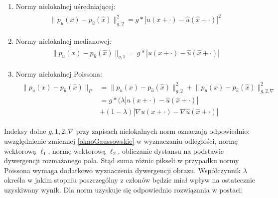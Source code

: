 \documentclass[12pt, twoside, openany]{report}
\theoremstyle{definition}
\begin{document}
\begin{enumerate}
\item
Normy nielokalnej uśredniającej:
\begin{align}
\begin{aligned}
\big\| p_{u}(x) - p_{\hat{u}}(\hat{x}) \big\|^{2}_{g,2} = g \ast | u(x+\cdot) - \hat{u}(\hat{x}+\cdot) |^2
\label{nonLocalMeans}
\end{aligned}
\end{align}
\item
Normy nielokalnej medianowej:
\begin{align}
\begin{aligned}
\big\| p_{u}(x) - p_{\hat{u}}(\hat{x}) \big\|_{g,1} = g \ast | u(x+\cdot) - \hat{u}(\hat{x}+\cdot) |
\label{nonLocalMedians}
\end{aligned}
\end{align}
\item
Normy nielokalnej Poissona:
\begin{align}
\begin{aligned}
\big\| p_{u}(x) - p_{\hat{u}}(\hat{x}) \big\|_{P} &= \big\| p_{u}(x) - p_{\hat{u}}(\hat{x}) \big\|^{2}_{g,2} + \big\| p_{u}(x) - p_{\hat{u}}(\hat{x}) \big\|^{2}_{g,2,\nabla} \\
&= g \ast (\lambda | u(x+\cdot) - \hat{u}(\hat{x}+\cdot) | \\
&+ (1-\lambda)|\nabla u(x+\cdot) - \nabla \hat{u}(\hat{x}+\cdot)|
\label{nonLocalpoisson}
\end{aligned}
\end{align}
\end{enumerate}
Indeksy dolne $g, 1, 2, \nabla$ przy zapisach nielokalnych norm oznaczają odpowiednio: uwzględnienie zmiennej \eqref{oknoGaussowskie} w wyznaczaniu odległości, normę wektorową $\ell_{1}$, normę wektorową $\ell_{2}$, obliczanie dystansu na podstawie dywergencji rozmażanego pola. Stąd suma różnic pikseli w przypadku normy Poissona wymaga dodatkowo wyznaczenia dywergencji obrazu. Współczynnik $\lambda$ określa w jakim stopniu poszczególny z członów będzie miał wpływ na ostatecznie uzyskiwany wynik. Dla norm uzyskuje się odpowiednio rozwiązania w postaci:
\end{document}
